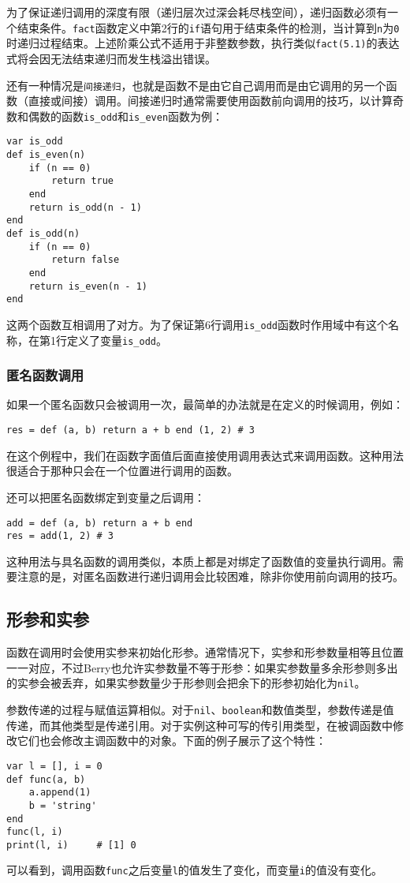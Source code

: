 为了保证递归调用的深度有限（递归层次过深会耗尽栈空间），递归函数必须有一个结束条件。\texttt{fact}函数定义中第2行的\texttt{if}语句用于结束条件的检测，当计算到\texttt{n}为\texttt{0}时递归过程结束。上述阶乘公式不适用于非整数参数，执行类似\texttt{fact(5.1)}的表达式将会因无法结束递归而发生栈溢出错误。

还有一种情况是\texttt{间接递归}，也就是函数不是由它自己调用而是由它调用的另一个函数（直接或间接）调用。间接递归时通常需要使用函数前向调用的技巧，以计算奇数和偶数的函数\texttt{is\_odd}和\texttt{is\_even}函数为例：
\begin{lstlisting}[language=berry]
var is_odd
def is_even(n)
    if (n == 0)
        return true
    end
    return is_odd(n - 1) 
end
def is_odd(n)
    if (n == 0)
        return false
    end
    return is_even(n - 1) 
end
\end{lstlisting}
这两个函数互相调用了对方。为了保证第6行调用\texttt{is\_odd}函数时作用域中有这个名称，在第1行定义了变量\texttt{is\_odd}。

\subsubsection{匿名函数调用}

如果一个匿名函数只会被调用一次，最简单的办法就是在定义的时候调用，例如：
\begin{lstlisting}[language=berry, numbers=none]
res = def (a, b) return a + b end (1, 2) # 3
\end{lstlisting}
在这个例程中，我们在函数字面值后面直接使用调用表达式来调用函数。这种用法很适合于那种只会在一个位置进行调用的函数。

还可以把匿名函数绑定到变量之后调用：
\begin{lstlisting}[language=berry, numbers=none]
add = def (a, b) return a + b end
res = add(1, 2) # 3
\end{lstlisting}
这种用法与具名函数的调用类似，本质上都是对绑定了函数值的变量执行调用。需要注意的是，对匿名函数进行递归调用会比较困难，除非你使用前向调用的技巧。

\subsection{形参和实参}

函数在调用时会使用实参来初始化形参。通常情况下，实参和形参数量相等且位置一一对应，不过Berry也允许实参数量不等于形参：如果实参数量多余形参则多出的实参会被丢弃，如果实参数量少于形参则会把余下的形参初始化为\texttt{nil}。

参数传递的过程与赋值运算相似。对于\texttt{nil}、\texttt{boolean}和数值类型，参数传递是值传递，而其他类型是传递引用。对于实例这种可写的传引用类型，在被调函数中修改它们也会修改主调函数中的对象。下面的例子展示了这个特性：
\begin{lstlisting}[language=berry]
var l = [], i = 0
def func(a, b)
    a.append(1)
    b = 'string'
end
func(l, i)
print(l, i)     # [1] 0
\end{lstlisting}
可以看到，调用函数\texttt{func}之后变量\texttt{l}的值发生了变化，而变量\texttt{i}的值没有变化。

